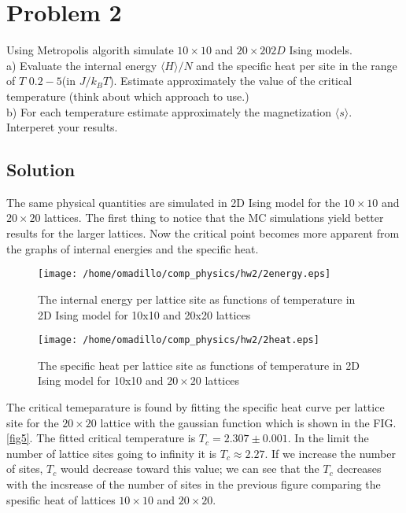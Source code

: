 \documentclass[a4paper,prb,8pt]{revtex4-1}
\begin{document}
\section*{Problem 2}

Using Metropolis algorith simulate $10\times10$ and $20\times20 2D$ Ising models.\\
a) Evaluate the internal energy $\langle H \rangle/N$ and the specific heat per site in the range of $T$ $0.2-5$(in $J/k_B T$). Estimate approximately the value of the critical temperature (think about which approach to use.)\\
b) For each temperature estimate approximately the magnetization $\langle s \rangle$. Interperet your results.  
\subsection*{Solution}

The same physical quantities are simulated in 2D Ising model for the  $10\times10$ and $20\times20$ lattices. The first thing to notice that the MC simulations yield better results for the larger lattices.  Now the critical point becomes more apparent from the graphs of internal energies and the specific heat.

\begin{figure}[H]
\begin{center}
\texttt{[image: /home/omadillo/comp\_physics/hw2/2energy.eps]}
\caption{The internal energy per lattice site as functions of temperature in 2D Ising model for 10x10 and 20x20 lattices}
\label{fig3}
\end{center}
\end{figure}

\begin{figure}[H]
\begin{center}
\texttt{[image: /home/omadillo/comp\_physics/hw2/2heat.eps]}
\caption{The specific heat per lattice site as functions of temperature in 2D Ising model for 10x10 and $20\times20$ lattices}
\label{figr4}
\end{center}
\end{figure}
The critical temeparature is found by fitting the specific heat curve per lattice site for the $20\times20$ lattice with the gaussian function which is shown in the FIG.\ref{fig5}. The fitted critical temperature is $T_c = 2.307\pm 0.001$. In the limit the number of lattice sites going to infinity it is $T_c\approx 2.27$. If we increase the number of sites, $T_c$ would decrease toward this value; we can see that the $T_c$ decreases with the incsrease of the number of sites in the previous figure comparing the spesific heat of lattices $10\times10$ and $20\times20$. 
\end{document}
